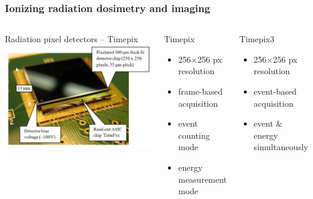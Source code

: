 \documentclass[aspectratio=169]{beamer}
\begin{document}
\begin{frame}
\frametitle{Ionizing radiation dosimetry and imaging}

  \begin{columns}[c]
  
  \begin{block}{Radiation pixel detectors -- Timepix}
    \includegraphics[width=1.0\textwidth]{./fig/timepix.jpg}
  \end{block} 
  
  \begin{block}{Timepix}
    \begin{itemize}
      \item 256$\times$256 px resolution
      \item frame-based acquisition
      \item event counting mode
      \item energy measurement mode
    \end{itemize}
  \end{block}

  \begin{block}{Timepix3}
    \begin{itemize}
      \item 256$\times$256 px resolution
      \item event-based acquisition
      \item event \& energy simultaneously
    \end{itemize}
  \end{block}

  \end{columns}

\end{frame}
\end{document}
